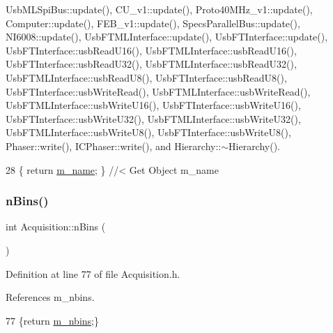 Usb\+M\+L\+Spi\+Bus\+::update(), C\+U\+\_\+v1\+::update(), Proto40\+M\+Hz\+\_\+v1\+::update(), Computer\+::update(), F\+E\+B\+\_\+v1\+::update(), Specs\+Parallel\+Bus\+::update(), N\+I6008\+::update(), Usb\+F\+T\+M\+L\+Interface\+::update(), Usb\+F\+T\+Interface\+::update(), Usb\+F\+T\+Interface\+::usb\+Read\+U16(), Usb\+F\+T\+M\+L\+Interface\+::usb\+Read\+U16(), Usb\+F\+T\+Interface\+::usb\+Read\+U32(), Usb\+F\+T\+M\+L\+Interface\+::usb\+Read\+U32(), Usb\+F\+T\+M\+L\+Interface\+::usb\+Read\+U8(), Usb\+F\+T\+Interface\+::usb\+Read\+U8(), Usb\+F\+T\+Interface\+::usb\+Write\+Read(), Usb\+F\+T\+M\+L\+Interface\+::usb\+Write\+Read(), Usb\+F\+T\+M\+L\+Interface\+::usb\+Write\+U16(), Usb\+F\+T\+Interface\+::usb\+Write\+U16(), Usb\+F\+T\+Interface\+::usb\+Write\+U32(), Usb\+F\+T\+M\+L\+Interface\+::usb\+Write\+U32(), Usb\+F\+T\+M\+L\+Interface\+::usb\+Write\+U8(), Usb\+F\+T\+Interface\+::usb\+Write\+U8(), Phaser\+::write(), I\+C\+Phaser\+::write(), and Hierarchy\+::$\sim$\+Hierarchy().


\begin{DoxyCode}
28 \{ \textcolor{keywordflow}{return} \hyperlink{classObject_a8b83c95c705d2c3ba0d081fe1710f48d}{m\_name}; \} \textcolor{comment}{//< Get Object m\_name}
\end{DoxyCode}
\mbox{\label{classAcquisition_a3a3dad0de9535d5a29c0810a5bdc3ae3}} 
\subsubsection{\texorpdfstring{n\+Bins()}{nBins()}\hspace{0.1cm}{\footnotesize\ttfamily [1/2]}}
{\footnotesize\ttfamily int Acquisition\+::n\+Bins (\begin{DoxyParamCaption}{ }\end{DoxyParamCaption})\hspace{0.3cm}{\ttfamily [inline]}}



Definition at line 77 of file Acquisition.\+h.



References m\+\_\+nbins.


\begin{DoxyCode}
77 \{\textcolor{keywordflow}{return} \hyperlink{classAcquisition_a05bccdc4b9ada37beaeba8794ccef12d}{m\_nbins};\}
\end{DoxyCode}
\mbox{\label{classAcquisition_a3a3dad0de9535d5a29c0810a5bdc3ae3}} 
